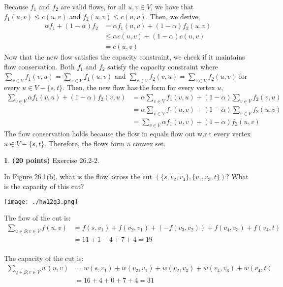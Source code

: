 \documentclass[11pt]{article}
\theoremstyle{definition}
\theoremstyle{theorem}
\newtheorem{prob}{}
\newcommand{\solution}{\medskip\noindent{\color{DarkBlue}\textbf{Solution:}}}
\begin{document}
Because $f_1$ and $f_2$ are valid flows, for all $u, v \in V$, we have that $f_1(u, v) \le c(u, v)$ and $f_2(u, v) \le c(u, v)$. Then, we derive,
\[
\begin{split}
\alpha f_1 + (1 - \alpha) f_2 
&=   \alpha f_1(u, v) + (1 - \alpha)f_2(u, v) \\
&\le \alpha c(u, v) + (1 - \alpha) c(u, v) \\
&=   c(u, v)
\end{split}
\]
Now that the new flow satisfies the capacity constraint, we check if it maintains flow conservation. Both $f_1$ and $f_2$ satisfy the capacity constraint where $\sum_{v \in V} f_1(v, u) = \sum_{v \in V} f_1(u, v)$ and $\sum_{v \in V} f_2(v, u) = \sum_{v \in V} f_2(u, v)$ for every $u \in V - \{s, t\}$. Then, the new flow has the form for every vertex $u$, 
\[
\begin{split}
\sum_{v \in V} \alpha f_1(v, u) + (1 - \alpha) f_2(v, u)
&= \alpha \sum_{v \in V} f_1(v, u) + (1 - \alpha) \sum_{v \in V} f_2(v, u) \\
&= \alpha \sum_{v \in V} f_1(u, v) + (1 - \alpha) \sum_{v \in V} f_2(u, v) \\
&= \sum_{v \in V} \alpha f_1(u, v) + (1 - \alpha) f_2(u, v)
\end{split}
\]
The flow conservation holds because the flow in equals flow out w.r.t every vertex $u \in V - \{s, t\}$. Therefore, the flows form a convex set.


\newpage
\begin{prob} \textbf{(20 points)} Exercise 26.2-2.
\end{prob}

In Figure 26.1(b), what is the flow across the cut $(\{s, v_2, v_4\}, \{v_1, v_3, t\})$? What is the capacity of this cut?

\solution

\texttt{[image: ./hw12q3.png]}

The flow of the cut is:
\[
\begin{split}
\sum_{u \in S; v \in V} f(u, v) 
&= f(s, v_1) + f(v_2, v_1) + (- f(v_3, v_2)) + f(v_4, v_3) + f(v_4, t) \\
&= 11 + 1 - 4 + 7 + 4 = 19 \\
\end{split}
\]

The capacity of the cut is:
\[
\begin{split}
\sum_{u \in S; v \in V} w(u, v) 
&= w(s, v_1) + w(v_2, v_1) + w(v_2, v_3) + w(v_4, v_3) + w(v_4, t) \\
&= 16 + 4 + 0 + 7 + 4 = 31 \\
\end{split}
\]
\end{document}
